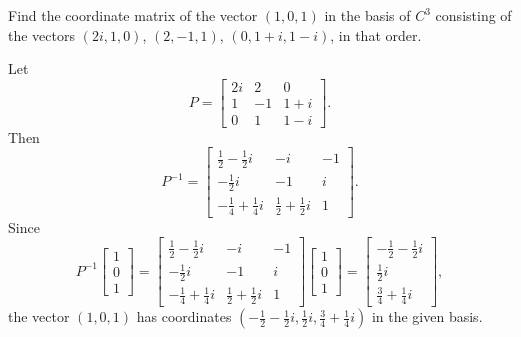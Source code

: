  Find the coordinate matrix of the vector $(1, 0, 1)$ in the
basis of $C^3$ consisting of the vectors $(2i, 1, 0)$, $(2, -1, 1)$,
$(0, 1 + i, 1 - i)$, in that order.
\begin{solution}
  Let
  \begin{equation*}
    P =
    \begin{bmatrix}
      2i & 2 & 0 \\
      1 & -1 & 1 + i \\
      0 & 1 & 1 - i
    \end{bmatrix}.
  \end{equation*}
  Then
  \begin{equation*}
    P^{-1} =
    \begin{bmatrix}
      \frac12 - \frac12i & -i & -1 \\[3pt]
      -\frac12i & -1 & i \\[3pt]
      -\frac14 + \frac14i & \frac12 + \frac12i & 1
    \end{bmatrix}.
  \end{equation*}
  Since
  \begin{equation*}
    P^{-1}
    \begin{bmatrix}
      1 \\ 0 \\ 1
    \end{bmatrix}
    =
    \begin{bmatrix}
      \frac12 - \frac12i & -i & -1 \\[3pt]
      -\frac12i & -1 & i \\[3pt]
      -\frac14 + \frac14i & \frac12 + \frac12i & 1
    \end{bmatrix}
    \begin{bmatrix}
      1 \\ 0 \\ 1
    \end{bmatrix}
    =
    \begin{bmatrix}
      -\frac12 - \frac12i \\[3pt] \frac12i \\[3pt] \frac34 + \frac14i
    \end{bmatrix},
  \end{equation*}
  the vector $(1,0,1)$ has coordinates
  $\left(-\frac12 - \frac12i, \frac12i, \frac34 + \frac14i\right)$ in
  the given basis.
\end{solution}
